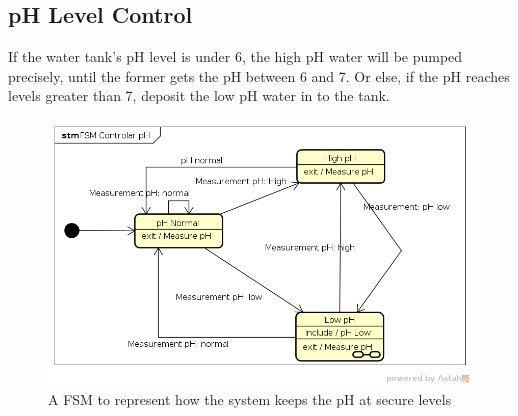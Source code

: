 \subsection{pH Level Control}
    If the water tank's pH level is under 6,
    the high pH water will be pumped precisely,
    until the former gets the pH between 6 and 7.
    Or else,
    if the pH reaches levels greater than 7,
    deposit the low pH water in to the tank.

    \begin{figure}[h]
        \centering
        \includegraphics[width=.7\textwidth]{diagrams/pH_Control}
        \caption{A FSM to represent how the system keeps the pH at secure levels}
        \label{fig:fsm_pHc}
    \end{figure}
